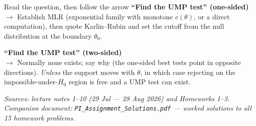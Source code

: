 \documentclass[11pt]{article}
\theoremstyle{remark}
\begin{document}
\begin{recipebox}{Read the question, then follow the arrow}
\smallskip
\textbf{``Find the UMP test'' (one-sided)}\\
$\to$ Establish MLR (exponential family with monotone $c(\theta)$, or a direct computation),
then quote Karlin--Rubin and set the cutoff from the null distribution at the boundary
$\theta_0$.

\smallskip
\textbf{``Find the UMP test'' (two-sided)}\\
$\to$ Normally none exists; say why (the one-sided best tests point in opposite directions).
\emph{Unless} the support moves with $\theta$, in which case rejecting on the
impossible-under-$H_0$ region is free and a UMP test can exist.
\end{recipebox}

\vfill
\begin{center}
\small\itshape Sources: lecture notes 1--10 (29 Jul --- 28 Aug 2026) and Homeworks 1--3.\\
Companion document: \texttt{PI\_Assignment\_Solutions.pdf} --- worked solutions to all 15 homework problems.
\end{center}
\end{document}
